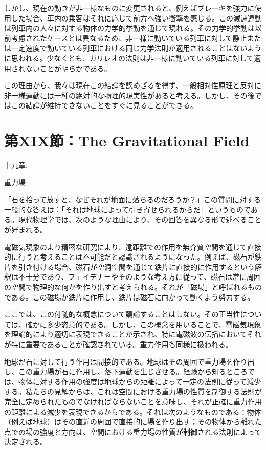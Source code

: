 \documentclass[a4paper,11pt,openany]{ltjsbook}
\begin{document}
しかし、現在の動きが非一様なものに変更されると、例えばブレーキを強力に使用した場合、車内の乗客はそれに応じて前方へ強い衝撃を感じる。この減速運動は列車内の人々に対する物体の力学的挙動を通じて現れる。その力学的挙動は以前考慮されたケースとは異なるため、非一様に動いている列車に対して静止または一定速度で動いている列車における同じ力学法則が適用されることはないように思われる。少なくとも、ガリレオの法則は非一様に動いている列車に対して適用されないことが明らかである。

この理由から、我々は現在この結論を認めざるを得ず、一般相対性原理と反対に非一様運動には一種の絶対的な物理的現実性があると考える。しかし、その後ではこの結論が維持できないことをすぐに見ることができる。


\clearpage
\chapter{第XIX節：The Gravitational Field}

十九章.

重力場

「石を拾って放すと、なぜそれが地面に落ちるのだろうか？」この質問に対する一般的な答えは：「それは地球によって引き寄せられるからだ」というものである。現代物理学では、次のような理由により、その回答を異なる形で述べることが好まれる。

電磁気現象のより精密な研究により、遠距離での作用を無介質空間を通じて直接的に行うと考えることは不可能だと認識されるようになった。例えば、磁石が鉄片を引き付ける場合、磁石が空洞空間を通じて鉄片に直接的に作用するという解釈は不十分であり、フェイデナーやそのような考え方に従って、磁石は常に周囲の空間で物理的な何かを作り出すと考えられる。それが「磁場」と呼ばれるものである。この磁場が鉄片に作用し、鉄片は磁石に向かって動くよう努力する。

ここでは、この付随的な概念について議論することはしない。その正当性については、確かに多少恣意的である。しかし、この概念を用いることで、電磁気現象を理論的により適切に表現できることが示され、特に電磁波の伝播においてそれが特に重要であることが確認されている。重力作用も同様に扱われる。

地球が石に対して行う作用は間接的である。地球はその周囲で重力場を作り出し、この重力場が石に作用し、落下運動を生じさせる。経験から知るところでは、物体に対する作用の強度は地球からの距離によって一定の法則に従って減少する。私たちの見解からは、これは空間における重力場の性質を制御する法則が完全に定められたものでなければならないことを意味し、それが正確に重力作用の距離による減少を表現できるからである。それは次のようなものである：物体（例えば地球）はその直近の周囲で直接的に場を作り出す；その物体から離れた点での場の強度と方向は、空間における重力場の性質が制御される法則によって決定される。
\end{document}

